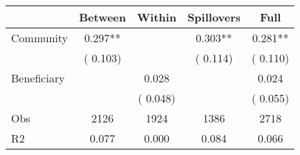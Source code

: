 
\begin{tabular}{l*{4}{c}}\hline&\multicolumn{1}{c}{Between}&\multicolumn{1}{c}{Within}&\multicolumn{1}{c}{Spillovers}&\multicolumn{1}{c}{Full}\\ \hline
 Community             &              0.297**      &                                               &        0.303** &         0.281**                            \\ 
                               &        (       0.103)           &                                       &       (       0.114)     &      (       0.110)                                           \\ 
 Beneficiary   &                                               &        0.028    &                                &             0.024                            \\ 
                               &                                               & (       0.048)                  &                                        &      (       0.055)                                           \\ 
\hline                                                                                                                                                                                                                                            
 Obs                   &               2126               &       1924                       &       1386                &              2718                                               \\ 
 R2                    &                      0.077              &              0.000                      &              0.084               &                     0.066                                              \\ 
\hline \end{tabular}                                                                                                                                                                                                              